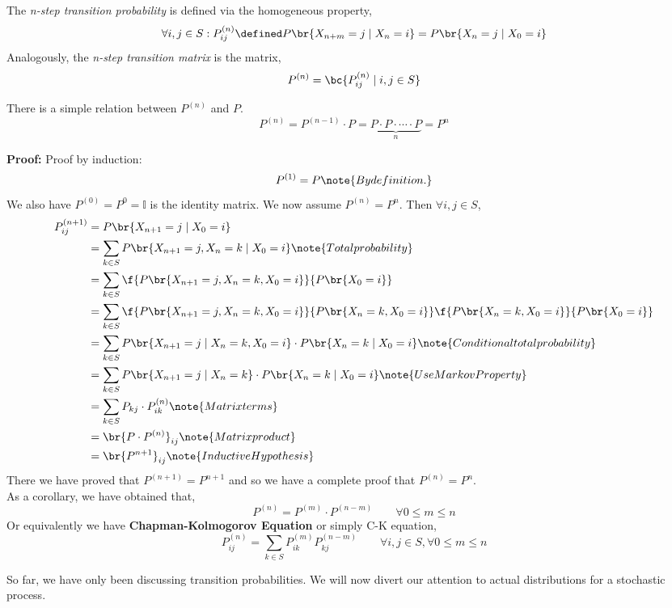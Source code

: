 \documentclass{article}
\begin{document}
The \textit{n-step transition probability} is defined via the homogeneous property,
\[ \forall i,j \in S : P_{ij}^{(n)} \defined P\br{X_{n+m} = j \mid X_{n} = i} = P\br{X_{n} = j \mid X_{0} = i} \]
Analogously, the \textit{n-step transition matrix} is the matrix,
\[ P^{(n)} = \bc{P_{ij}^{(n)} \mid i, j \in S} \]

There is a simple relation between $P^{(n)}$ and $P$.
\[ P^{(n)} = P^{(n-1)} \cdot P = \underbrace{P \cdot P \cdot \cdots \cdot P}_{n} = P^n \]

\textbf{Proof:} Proof by induction:
\[ P^{(1)} = P \note{By definition.} \]
We also have $P^{(0)} = P^{0} = \mathbb{I}$ is the identity matrix. We now assume $P^{(n)} = P^{n}$. Then $\forall i,j \in S$,
\begin{align*}
    P_{ij}^{(n+1)} &= P\br{X_{n+1} = j \mid X_{0} = i} \\
    &= \sum_{k \in S} P\br{X_{n+1} = j, X_{n} = k \mid X_{0} = i} \note{Total probability}\\
    &= \sum_{k \in S} \f{P\br{X_{n+1} = j, X_{n} = k, X_{0} = i}}{P\br{X_{0} = i}} \\
    &= \sum_{k \in S} \f{P\br{X_{n+1} = j, X_{n} = k, X_{0} = i}}{P\br{X_{n} = k, X_{0} = i}}\f{P\br{X_{n} = k, X_{0} = i}}{P\br{X_{0} = i}} \\
    &= \sum_{k \in S} P\br{X_{n+1} = j \mid X_{n} = k, X_{0} = i} \cdot P\br{X_{n} = k \mid X_{0} = i} \note{Conditional total probability}\\
    &= \sum_{k \in S} P\br{X_{n+1} = j \mid X_{n} = k} \cdot P\br{X_{n} = k \mid X_{0} = i} \note{Use Markov Property}\\
    &= \sum_{k \in S} P_{kj} \cdot P_{ik}^{(n)} \note{Matrix terms}\\
    &= \br{P \cdot P^{(n)}}_{ij} \note{Matrix product}\\
    &= \br{P^{n+1}}_{ij} \note{Inductive Hypothesis}
\end{align*}
There we have proved that $P^{(n+1)} = P^{n+1}$ and so we have a complete proof that $P^{(n)} = P^{n}$.\\

As a corollary, we have obtained that,
\[ P^{(n)} = P^{(m)} \cdot P^{(n-m)} \qquad \forall 0 \leq m \leq n \]
Or equivalently we have \textbf{Chapman-Kolmogorov Equation} or simply C-K equation,
\[ P^{(n)}_{ij} = \sum_{k \in S} P^{(m)}_{ik} P^{(n-m)}_{kj} \qquad \forall i,j \in S, \forall 0 \leq m \leq n \]

So far, we have only been discussing transition probabilities. We will now divert our attention to actual distributions for a stochastic process. \\
\end{document}
